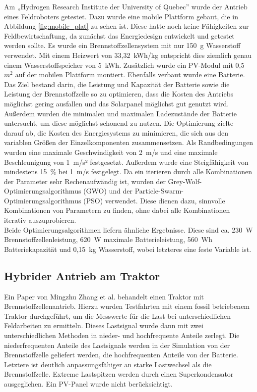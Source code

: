 Am „Hydrogen Research Institute der University of Quebec” wurde der Antrieb eines Feldroboters getestet. Dazu wurde eine mobile Plattform gebaut, die in Abbildung \ref{fig:mobile_plat} zu sehen ist. Diese hatte noch keine Fähigkeiten zur Feldbewirtschaftung, da zunächst das Energiedesign entwickelt und getestet werden sollte. Es wurde ein Brennstoffzellensystem mit nur 150~g Wasserstoff verwendet. Mit einem Heizwert von 33,32~kWh/kg entspricht dies ziemlich genau einem Wasserstoffspeicher von 5~kWh. Zusätzlich wurde ein PV-Modul mit 0,5~$m^{2}$ auf der mobilen Plattform montiert. Ebenfalls verbaut wurde eine Batterie. Das Ziel bestand darin, die Leistung und Kapazität der Batterie sowie die Leistung der Brennstoffzelle so zu optimieren, dass die Kosten des Antriebs möglichst gering ausfallen und das Solarpanel möglichst gut genutzt wird. Außerdem wurden die minimalen und maximalen Ladezustände der Batterie untersucht, um diese möglichst schonend zu nutzen. Die Optimierung zielte darauf ab, die Kosten des Energiesystems zu minimieren, die sich aus den variablen Größen der Einzelkomponenten zusammensetzen. Als Randbedingungen wurden eine maximale Geschwindigkeit von 2~m/s und eine maximale Beschleunigung von 1~m/s² festgesetzt. Außerdem wurde eine Steigfähigkeit von mindestens 15~\% bei 1~m/s festgelegt. 
Da ein iterieren durch alle Kombinationen der Parameter sehr Rechenaufwändig ist, wurden der Grey-Wolf-Optimierungsalgorithmus (GWO) und der Particle-Swarm-Optimierungsalgorithmus (PSO) verwendet. Diese dienen dazu, sinnvolle Kombinationen von Parametern zu finden, ohne dabei alle Kombinationen iterativ auszuprobieren. \cite{ghobadpour_optimal_2023} \\
Beide Optimierungsalgorithmen liefern ähnliche Ergebnisse. Diese sind ca. 230~W Brennstoffzellenleistung, 620~W maximale Batterieleistung, 560~Wh Batteriekapazität und 0,15~kg Wasserstoff, wobei letzteres eine feste Variable ist. \cite{ghobadpour_optimal_2023} \\


\subsection{Hybrider Antrieb am Traktor}
Ein Paper von Mingzhu Zhang et al. behandelt einen Traktor mit Brennstoffzellenantrieb. Hierzu wurden Testfahrten mit einem fossil betriebenem Traktor durchgeführt, um die Messwerte für die Last bei unterschiedlichen Feldarbeiten zu ermitteln. Dieses Lastsignal wurde dann mit zwei unterschiedlichen Methoden in nieder- und hochfrequente Anteile zerlegt. Die niederfrequenten Anteile des Lastsignals werden in der Simulation von der Brennstoffzelle geliefert werden, die hochfrequenten Anteile von der Batterie. Letztere ist deutlich anpassungsfähiger an starke Lastwechsel als die Brennstoffzelle. Extreme Lastspitzen werden durch einen Superkondensator ausgeglichen. Ein PV-Panel wurde nicht berücksichtigt. \cite{zhang_energy_2024} \\

